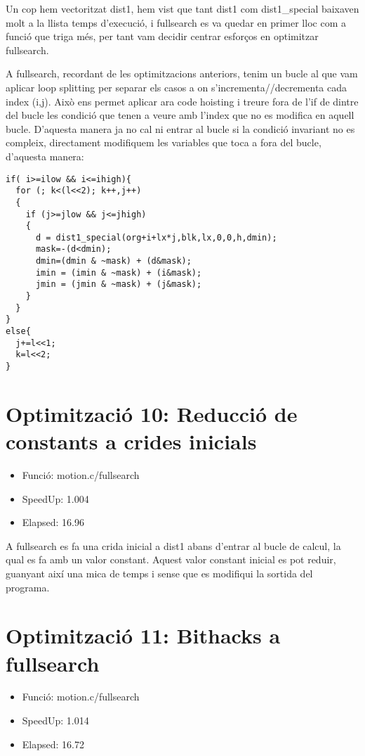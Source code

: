 Un cop hem vectoritzat dist1, hem vist que tant dist1 com dist1\_special baixaven molt a la llista temps d'execució, i fullsearch es va quedar en primer lloc com a funció que triga més, per tant vam decidir centrar esforços en optimitzar fullsearch.

A fullsearch, recordant de les optimitzacions anteriors, tenim un bucle al que vam aplicar loop splitting per separar els casos a on s'incrementa//decrementa cada index (i,j). Això ens permet aplicar ara code hoisting i treure fora de l'if de dintre del bucle les condició que tenen a veure amb l'index que no es modifica en aquell bucle. D'aquesta manera ja no cal ni entrar al bucle si la condició invariant no es compleix, directament modifiquem les variables que toca a fora del bucle, d'aquesta manera:

\begin{lstlisting}
if( i>=ilow && i<=ihigh){
  for (; k<(l<<2); k++,j++)
  {
    if (j>=jlow && j<=jhigh)
    {
      d = dist1_special(org+i+lx*j,blk,lx,0,0,h,dmin);
      mask=-(d<dmin);
      dmin=(dmin & ~mask) + (d&mask);
      imin = (imin & ~mask) + (i&mask);
      jmin = (jmin & ~mask) + (j&mask);
    }
  } 
}
else{
  j+=l<<1;
  k=l<<2;	
}	 	
\end{lstlisting}

\section{Optimitzaci\'o 10: Reducci\'o de constants a crides inicials}
\begin{itemize}
\item{Funció: motion.c/fullsearch}
\item{SpeedUp: 1.004 }
\item{Elapsed: 16.96}
\end{itemize}

A fullsearch es fa una crida inicial a dist1 abans d'entrar al bucle de calcul, la qual es fa amb un valor constant. Aquest valor constant inicial es pot reduir, guanyant així una mica de temps i sense que es modifiqui la sortida del programa.

\section{Optimitzaci\'o 11: Bithacks a fullsearch}
\begin{itemize}
\item{Funció: motion.c/fullsearch}
\item{SpeedUp:  1.014}
\item{Elapsed:  16.72}
\end{itemize}

